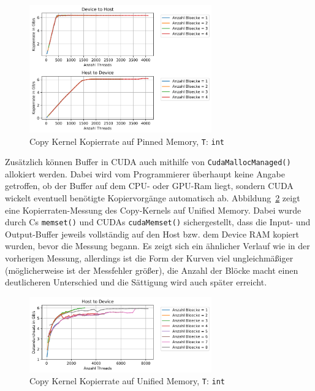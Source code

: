 \documentclass[11pt, abstract=on]{scrartcl}
\begin{document}
\begin{figure} [htbp]
 	\centering
 		\includegraphics[width=0.7\textwidth]{Graph_CudaMalloc.png}
 	\caption{Copy Kernel Kopierrate auf Pinned Memory, \texttt{T}: \texttt{int}}
 	\label{fig:CudaMalloc}
\end{figure}

Zusätzlich können Buffer in CUDA auch mithilfe von \texttt{CudaMallocManaged()} allokiert werden. Dabei wird vom Programmierer überhaupt keine Angabe getroffen, ob der Buffer auf dem CPU- oder GPU-Ram liegt, sondern CUDA wickelt eventuell benötigte Kopiervorgänge automatisch ab. Abbildung~\ref{fig:CudaMallocManaged} zeigt eine Kopierraten-Messung des Copy-Kernels auf Unified Memory. Dabei wurde durch Cs \texttt{memset()} und CUDAs \texttt{cudaMemset()} sichergestellt, dass die Input- und Output-Buffer jeweils vollständig auf den Host bzw. dem Device RAM kopiert wurden, bevor die Messung begann. Es zeigt sich ein ähnlicher Verlauf wie in der vorherigen Messung, allerdings ist die Form der Kurven viel ungleichmäßiger (möglicherweise ist der Messfehler größer), die Anzahl der Blöcke macht einen deutlicheren Unterschied und die Sättigung wird auch später erreicht.

\begin{figure} [htbp]
 	\centering
 		\includegraphics[width=0.7\textwidth]{Graph_CudaMallocManaged.png}
 	\caption{Copy Kernel Kopierrate auf Unified Memory, \texttt{T}: \texttt{int}}
 	\label{fig:CudaMallocManaged}
\end{figure}
\end{document}
